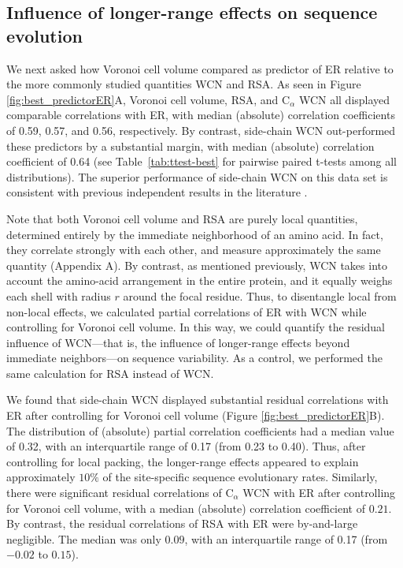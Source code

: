 \documentclass[12pt]{article}
\begin{document}
\subsection*{Influence of longer-range effects on sequence evolution}

We next asked how Voronoi cell volume compared as predictor of ER relative to the more commonly studied quantities WCN and RSA. As seen in Figure \ref{fig:best_predictorER}A, Voronoi cell volume, RSA, and C$_{\alpha}$ WCN all displayed comparable correlations with ER, with median (absolute) correlation coefficients of 0.59, 0.57, and 0.56, respectively. By contrast, side-chain WCN out-performed these predictors by a substantial margin, with median (absolute) correlation coefficient of 0.64 (see Table~\ref{tab:ttest-best} for pairwise paired t-tests among all distributions). The superior performance of side-chain WCN on this data set is consistent with previous independent results in the literature \cite{marcos_too_2015}. 

Note that both Voronoi cell volume and RSA are purely local quantities, determined entirely by the immediate neighborhood of an amino acid. In fact, they correlate strongly with each other, and measure approximately the same quantity (Appendix A). By contrast, as mentioned previously, WCN takes into account the amino-acid arrangement in the entire protein, and it equally weighs each shell with radius $r$ around the focal residue. Thus, to disentangle local from non-local effects, we calculated partial correlations of ER with WCN while controlling for Voronoi cell volume. In this way, we could quantify the residual influence of WCN---that is, the influence of longer-range effects beyond immediate neighbors---on sequence variability. As a control, we performed the same calculation for RSA instead of WCN. 

We found that side-chain WCN displayed substantial residual correlations with ER after controlling for Voronoi cell volume (Figure \ref{fig:best_predictorER}B). The distribution of (absolute) partial correlation coefficients had a median value of 0.32, with an interquartile range of 0.17 (from 0.23 to 0.40). Thus, after controlling for local packing, the longer-range effects appeared to explain approximately $10\%$ of the site-specific sequence evolutionary rates. Similarly, there were significant residual correlations of C$_\alpha$ WCN with ER after controlling for Voronoi cell volume, with a median (absolute) correlation coefficient of $0.21$. By contrast, the residual correlations of RSA with ER were by-and-large negligible. The median was only $0.09$, with an interquartile range of 0.17 (from $-0.02$ to $0.15$).
\end{document}
